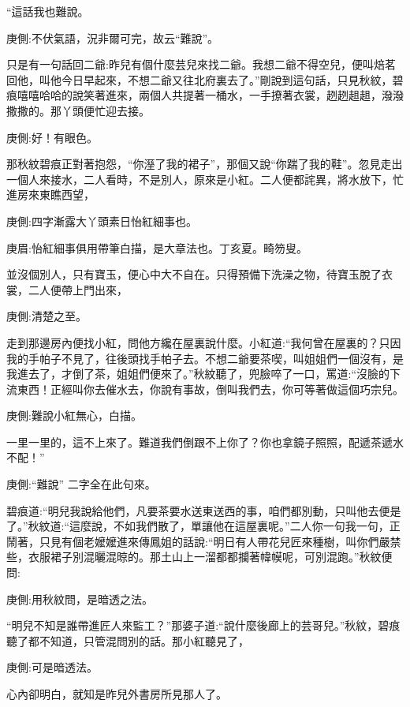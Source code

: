 \begin{parag}
    “這話我也難說。\begin{note}庚側:不伏氣語，況非爾可完，故云“難說”。\end{note}只是有一句話回二爺:昨兒有個什麼芸兒來找二爺。我想二爺不得空兒，便叫焙茗回他，叫他今日早起來，不想二爺又往北府裏去了。”剛說到這句話，只見秋紋，碧痕嘻嘻哈哈的說笑著進來，兩個人共提著一桶水，一手撩著衣裳，趔趔趄趄，潑潑撒撒的。那丫頭便忙迎去接。\begin{note}庚側:好！有眼色。\end{note}那秋紋碧痕正對著抱怨，“你溼了我的裙子”，那個又說“你踹了我的鞋”。忽見走出一個人來接水，二人看時，不是別人，原來是小紅。二人便都詫異，將水放下，忙進房來東瞧西望，\begin{note}庚側:四字漸露大丫頭素日怡紅細事也。\end{note}\begin{note}庚眉:怡紅細事俱用帶筆白描，是大章法也。丁亥夏。畸笏叟。\end{note}並沒個別人，只有寶玉，便心中大不自在。只得預備下洗澡之物，待寶玉脫了衣裳，二人便帶上門出來，\begin{note}庚側:清楚之至。\end{note}
\end{parag}


\begin{parag}
    走到那邊房內便找小紅，問他方纔在屋裏說什麼。小紅道:“我何曾在屋裏的？只因我的手帕子不見了，往後頭找手帕子去。不想二爺要茶喫，叫姐姐們一個沒有，是我進去了，才倒了茶，姐姐們便來了。”秋紋聽了，兜臉啐了一口，罵道:“沒臉的下流東西！正經叫你去催水去，你說有事故，倒叫我們去，你可等著做這個巧宗兒。\begin{note}庚側:難說小紅無心，白描。\end{note}一里一里的，這不上來了。難道我們倒跟不上你了？你也拿鏡子照照，配遞茶遞水不配！”\begin{note}庚側:“難說” 二字全在此句來。\end{note}碧痕道:“明兒我說給他們，凡要茶要水送東送西的事，咱們都別動，只叫他去便是了。”秋紋道:“這麼說，不如我們散了，單讓他在這屋裏呢。”二人你一句我一句，正鬧著，只見有個老嬤嬤進來傳鳳姐的話說:“明日有人帶花兒匠來種樹，叫你們嚴禁些，衣服裙子別混曬混晾的。那土山上一溜都都攔著幃幙呢，可別混跑。”秋紋便問:\begin{note}庚側:用秋紋問，是暗透之法。\end{note}“明兒不知是誰帶進匠人來監工？”那婆子道:“說什麼後廊上的芸哥兒。”秋紋，碧痕聽了都不知道，只管混問別的話。那小紅聽見了，\begin{note}庚側:可是暗透法。\end{note}心內卻明白，就知是昨兒外書房所見那人了。
\end{parag}


